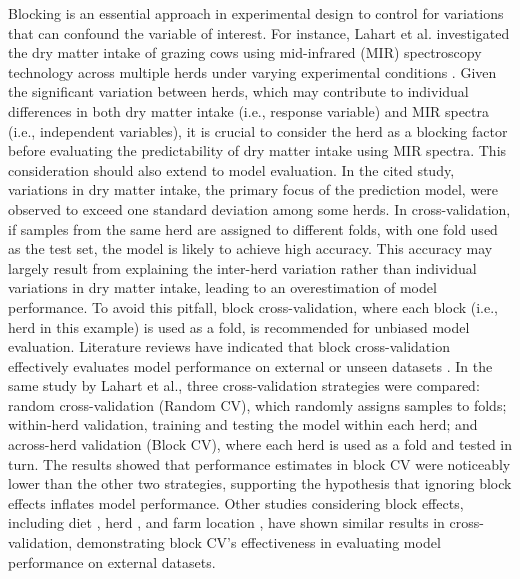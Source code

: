 Blocking is an essential approach in experimental design to control for variations that can confound the variable of interest. For instance, Lahart et al. investigated the dry matter intake of grazing cows using mid-infrared (MIR) spectroscopy technology across multiple herds under varying experimental conditions \citep{lahart_predicting_2019}. Given the significant variation between herds, which may contribute to individual differences in both dry matter intake (i.e., response variable) and MIR spectra (i.e., independent variables), it is crucial to consider the herd as a blocking factor before evaluating the predictability of dry matter intake using MIR spectra. This consideration should also extend to model evaluation. In the cited study, variations in dry matter intake, the primary focus of the prediction model, were observed to exceed one standard deviation among some herds. In cross-validation, if samples from the same herd are assigned to different folds, with one fold used as the test set, the model is likely to achieve high accuracy. This accuracy may largely result from explaining the inter-herd variation rather than individual variations in dry matter intake, leading to an overestimation of model performance. To avoid this pitfall, block cross-validation, where each block (i.e., herd in this example) is used as a fold, is recommended for unbiased model evaluation.
Literature reviews have indicated that block cross-validation effectively evaluates model performance on external or unseen datasets \citep{bresolin_infrared_2020}. In the same study by Lahart et al., three cross-validation strategies were compared: random cross-validation (Random CV), which randomly assigns samples to folds; within-herd validation, training and testing the model within each herd; and across-herd validation (Block CV), where each herd is used as a fold and tested in turn. The results showed that performance estimates in block CV were noticeably lower than the other two strategies, supporting the hypothesis that ignoring block effects inflates model performance. Other studies considering block effects, including diet \citep{grelet_potential_2020}, herd \citep{rovere_prediction_2021}, and farm location \citep{adriaens_productive_2020, mota_real-time_2022}, have shown similar results in cross-validation, demonstrating block CV's effectiveness in evaluating model performance on external datasets.

